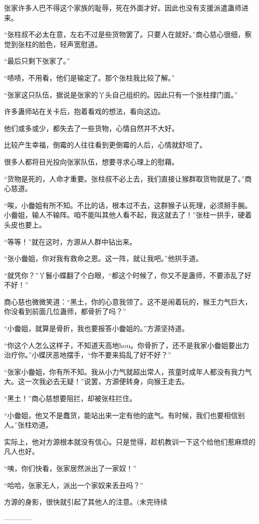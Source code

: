 \begin{this_body}
张家许多人巴不得这个家族的耻辱，死在外面才好。因此也没有支援派遣蛊师进来。

“张柱叔不必太在意，左右不过是些货物罢了。只要人在就好。”商心慈心很细，察觉到张柱的脸色，轻声宽慰道。

“最后只剩下张家了。”

“啧啧，不用看，他们是输定了。那个张柱我比较了解。”

“张家这只队伍，据说是张家的丫头自己组织的。因此只有一个张柱撑门面。”

许多蛊师站在关卡后，抱着看戏的想法，看向这边。

他们或多或少，都失去了一些货物，心情自然并不大好。

比较产生幸福，倒霉的人往往看到更倒霉的人后，心情就舒坦了。

很多人都将目光投向张家队伍，想要寻求心理上的慰藉。

“货物是死的，人命才重要。张柱叔不必上去，我们直接让猴群取货物就是了。”商心慈道。

“唉，小齤姐有所不知。不比的话，根本过不去，这群猴子认死理，必须掰手腕。小齤姐，输人不输阵。咱不能叫其他人看不起，我这就去了！”张柱一拱手，硬着头皮也要上。

“等等！”就在这时，方源从人群中钻出来。

“张小齤姐，你对我有救命之恩。这一阵，就让我吧。”他拱手道。

“就凭你？”丫鬟小蝶翻了个白眼，“都这个时候了，你又不是蛊师，不要添乱了好不好！”

商心慈也微微笑道：“黑土，你的心意我领了。这不是闹着玩的，猴王力气巨大，你没看到前面几位蛊师，都骨折了吗？”

“小齤姐，就算是骨折，我也要报答小齤姐的。”方源坚持道。

“你这个人怎么这样子，不知道天高地hou。你骨折了，还不是我家小齤姐要出力治疗你。”小蝶厌恶地摆手，“你不要来捣乱了好不好？”

“张家小齤姐，你有所不知。我从小力气就超出常人，孩童时成年人都没有我力气大。这一次我必去无疑！”说罢，方源便转身，向猴王走去。

“黑土！”商心慈想要阻拦，却被张柱拦住。

“小齤姐，他又不是蠢货，能站出来一定有他的底气。有时候，我们也要相信别人。”张柱劝道。

实际上，他对方源根本就没有信心。只是觉得，趁机教训一下这个给他们惹麻烦的凡人也好。

“咦，你们快看，张家居然派出了一家奴！”

“哈哈，张家无人，派出一个家奴来丢丑吗？”

方源的身影，很快就引起了其他人的注意。(未完待续

------------

\end{this_body}

